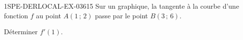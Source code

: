 \begin{exercice}{1SPE-DERLOCAL-EX-036}{1}{5}
Sur un graphique, la tangente à la courbe d'une fonction $f$ au point $A(1\,;\,2)$ passe par le point $B(3\,;\,6)$.

Déterminer $f'(1)$.
\end{exercice}
